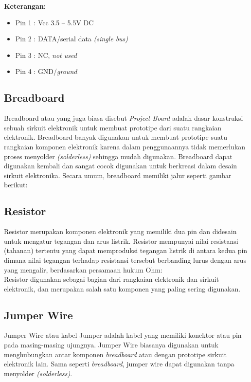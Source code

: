 \textbf{Keterangan:}
\begin{itemize}
	\item Pin 1 : Vcc 3.5 – 5.5V DC
	\item Pin 2 : DATA/serial data \textit{(single bus)}
	\item Pin 3 : NC, \textit{not used}
	\item Pin 4 : GND/\textit{ground}
\end{itemize}


\subsection{Breadboard}
\tab Breadboard atau yang juga biasa disebut \textit{Project Board} adalah dasar konstruksi sebuah sirkuit elektronik untuk membuat prototipe dari suatu rangkaian elektronik. Breadboard banyak digunakan untuk membuat prototipe suatu rangkaian komponen elektronik karena dalam penggunaannya tidak memerlukan proses menyolder \textit{(solderless)} sehingga mudah digunakan. Breadboard dapat digunakan kembali dan sangat cocok digunakan untuk berkreasi dalam desain sirkuit elektronika. Secara umum, breadboard memiliki jalur seperti gambar berikut:\\

\subsection{Resistor}
\tab Resistor merupakan komponen elektronik yang memiliki dua pin dan didesain untuk mengatur tegangan dan arus listrik. Resistor mempunyai nilai resistansi (tahanan) tertentu yang dapat memproduksi tegangan listrik di antara kedua pin dimana nilai tegangan terhadap resistansi tersebut berbanding lurus dengan arus yang mengalir, berdasarkan persamaan hukum Ohm:\\
\tab Resistor digunakan sebagai bagian dari rangkaian elektronik dan sirkuit elektronik, dan merupakan salah satu komponen yang paling sering digunakan. 

\subsection{Jumper Wire}
\tab Jumper Wire atau kabel Jumper adalah kabel yang memiliki konektor atau pin pada masing-masing ujungnya. Jumper Wire biasanya digunakan untuk menghubungkan antar komponen \textit{breadboard} atau dengan prototipe sirkuit elektronik lain. Sama seperti \textit{breadboard}, jumper wire dapat digunakan tanpa menyolder \textit{(solderless)}.
 
